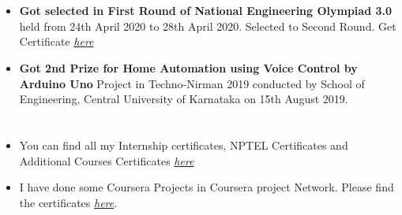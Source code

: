 \documentclass[]{article}
\begin{document}
\section*{\color{blue}{Awards/Participations/Selections}}
   \begin{itemize}
   \item \textbf{Got selected in First Round of National Engineering Olympiad 3.0} held from 24th April 2020 to 28th April 2020. Selected to Second Round. Get Certificate \href{https://drive.google.com/drive/u/0/folders/1afmjGeQ6c10q58FP6xpgcYjkM3Um7R69}{\em here}
     \item \textbf{Got 2nd Prize for Home Automation using Voice Control by Arduino Uno} Project in Techno-Nirman 2019 conducted by School of Engineering, Central University of Karnataka on 15th August 2019.
   \end{itemize}
\section*{\color{blue}{Other Links}}
    \begin{itemize}
    \item You can find all my Internship certificates, NPTEL Certificates and Additional Courses Certificates \href{https://drive.google.com/drive/folders/1afmjGeQ6c10q58FP6xpgcYjkM3Um7R69?usp=sharing}{\em here}
    \item I have done some Coursera Projects in Coursera project Network. Please find the certificates \href{https://drive.google.com/drive/u/0/folders/187CiSJKh_43Vlr-XUnmirNDy3oFicABx}{\em here}.
    \end{itemize}
\end{document}
